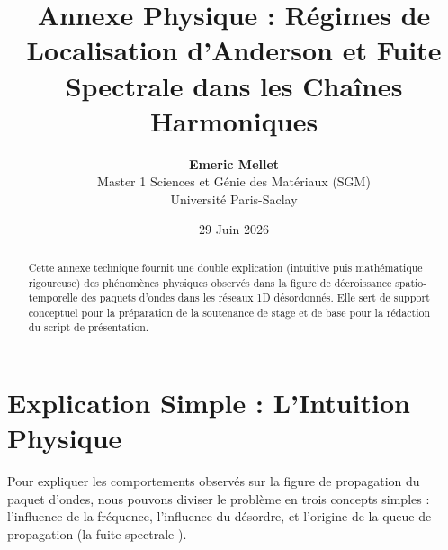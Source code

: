 \documentclass[11pt,a4paper]{article}
\title{\textbf{Annexe Physique : Régimes de Localisation d'Anderson et Fuite Spectrale dans les Chaînes Harmoniques}}
\author{\textbf{Emeric Mellet} \\ Master 1 Sciences et Génie des Matériaux (SGM) \\ Université Paris-Saclay}
\date{29 Juin 2026}
\begin{document}
\maketitle

\begin{abstract}
Cette annexe technique fournit une double explication (intuitive puis mathématique rigoureuse) des phénomènes physiques observés dans la figure de décroissance spatio-temporelle des paquets d'ondes dans les réseaux 1D désordonnés. Elle sert de support conceptuel pour la préparation de la soutenance de stage et de base pour la rédaction du script de présentation.
\end{abstract}

\tableofcontents
\newpage

\section{Explication Simple : L'Intuition Physique}

Pour expliquer les comportements observés sur la figure de propagation du paquet d'ondes, nous pouvons diviser le problème en trois concepts simples : l'influence de la fréquence, l'influence du désordre, et l'origine de la queue de propagation (la \og  fuite spectrale \fg{}).
\end{document}

